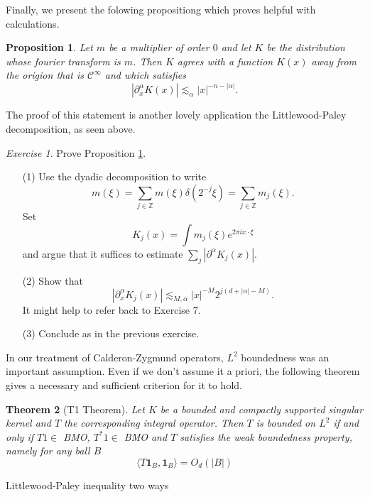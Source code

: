 \documentclass[11pt]{article}
\newtheorem{thm}{Theorem}
\newtheorem{prop}[thm]{Proposition}
\theoremstyle{remark}
\newtheorem{exr}{Exercise}
\newcommand{\calC}{\mathcal{C}}
\newcommand{\1}{\textbf{1}}
\newcommand{\lle}{\lesssim}
\def\brac#1{\langle #1  \rangle}
\newcommand{\bbZ}{\mathbb{Z}}
\begin{document}
\vspace{4mm}
\noindent Finally, we present the folowing propositiong which proves helpful with calculations.
\begin{prop}
Let $m$ be a multiplier of order $0$ and let $K$ be the distribution whose fourier transform is $m$. Then $K$ agrees with a function $K(x)$ away from the origion that is $\calC^\infty$ and which satisfies
\[
|\partial_x^\alpha  K(x)| \lle_\alpha |x|^{-n-|\alpha|}.
\]
\label{prop:pseudomult}
\end{prop}
The proof of this statement is another lovely application the Littlewood-Paley decomposition, as seen above.
\begin{exr}
Prove Proposition \ref{prop:pseudomult}.
\begin{enumerate}
\item[(1)] Use the dyadic decomposition to write
\[
m(\xi) = \sum_{j \in \bbZ} m(\xi) \delta(2^{-j} \xi) = \sum_{j \in \bbZ} m_j(\xi).
\]
Set
\[
K_j(x) = \int m_j(\xi) e^{2 \pi i x \cdot \xi}
\]
and argue that it suffices to estimate $\sum_j |\partial^\alpha K_j(x)|$.
\item[(2)] Show that
\[
|\partial_x^\alpha K_j(x)| \lle_{M,\alpha} |x|^{-M} 2^{j(d + |\alpha| - M)}.
\]
It might help to refer back to Exercise 7.
\item[(3)] Conclude as in the previous exercise.
\end{enumerate}
\end{exr}


\noindent In our treatment of Calderon-Zygmund operators, $L^2$ boundedness was an important assumption. Even if we don't assume it a priori, the following theorem gives a necessary and sufficient criterion for it to hold.

\begin{thm}[T1 Theorem]
Let $K$ be a bounded and compactly supported singular kernel and $T$ the corresponding integral operator. Then $T$ is bounded on $L^2$ if and only if $T1 \in$ BMO, $T^*1 \in$ BMO and $T$ satisfies the weak boundedness property, namely for any ball $B$
\[
\brac{T\textbf{1}_B, \textbf{1}_B} = O_d(|B|)
\]
\end{thm}

\newpage
{\noindent\Large Littlewood-Paley inequality two ways}
\vspace{6mm}
\end{document}
